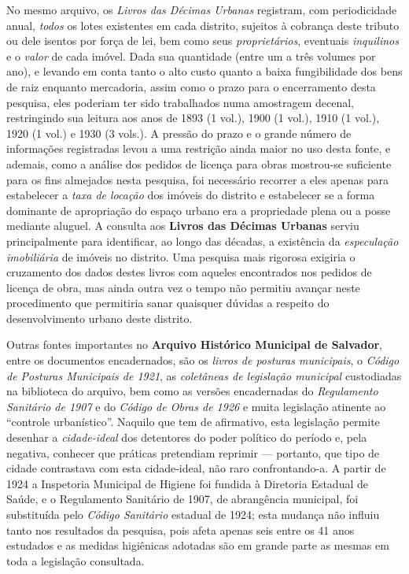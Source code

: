 No mesmo arquivo, os \textit{Livros das Décimas Urbanas} registram, com periodicidade anual, \textit{todos} os lotes existentes em cada distrito, sujeitos à cobrança deste tributo ou dele isentos por força de lei, bem como seus \textit{proprietários}, eventuais \textit{inquilinos} e o \textit{valor} de cada imóvel. Dada sua quantidade (entre um a três volumes por ano), e levando em conta tanto o alto custo quanto a baixa fungibilidade dos bens de raiz enquanto mercadoria, assim como o prazo para o encerramento desta pesquisa, eles poderiam ter sido trabalhados numa amostragem decenal, restringindo sua leitura aos anos de 1893 (1 vol.), 1900 (1 vol.), 1910 (1 vol.), 1920 (1 vol.) e 1930 (3 vols.). A pressão do prazo e o grande número de informações registradas levou a uma restrição ainda maior no uso desta fonte, e ademais, como a análise dos pedidos de licença para obras mostrou-se suficiente para os fins almejados nesta pesquisa, foi necessário recorrer a eles apenas para estabelecer a \textit{taxa de locação} dos imóveis do distrito e estabelecer se a forma dominante de apropriação do espaço urbano era a propriedade plena ou a posse mediante aluguel. A consulta aos \textbf{Livros das Décimas Urbanas} serviu principalmente para identificar, ao longo das décadas, a existência da \textit{especulação imobiliária} de imóveis no distrito. Uma pesquisa mais rigorosa exigiria o cruzamento dos dados destes livros com aqueles encontrados nos pedidos de licença de obra, mas ainda outra vez o tempo não permitiu avançar neste procedimento que permitiria sanar quaisquer dúvidas a respeito do desenvolvimento urbano deste distrito.

Outras fontes importantes no \textbf{Arquivo Histórico Municipal de Salvador}, entre os documentos encadernados, são os \textit{livros de posturas municipais}, o \textit{Código de Posturas Municipais de 1921}, as \textit{coletâneas de legislação municipal} custodiadas na biblioteca do arquivo, bem como as versões encadernadas do \textit{Regulamento Sanitário de 1907} e do \textit{Código de Obras de 1926} e muita legislação atinente ao ``controle urbanístico''. Naquilo que tem de afirmativo, esta legislação permite desenhar a \textit{cidade-ideal} dos detentores do poder político do período e, pela negativa, conhecer que práticas pretendiam reprimir --- portanto, que tipo de cidade contrastava com esta cidade-ideal, não raro confrontando-a. A partir de 1924 a Inspetoria Municipal de Higiene foi fundida à Diretoria Estadual de Saúde, e o Regulamento Sanitário de 1907, de abrangência municipal, foi substituída pelo \textit{Código Sanitário} estadual de 1924; esta mudança não influiu tanto nos resultados da pesquisa, pois afeta apenas seis entre os 41 anos estudados e as medidas higiênicas adotadas são em grande parte as mesmas em toda a legislação consultada.


